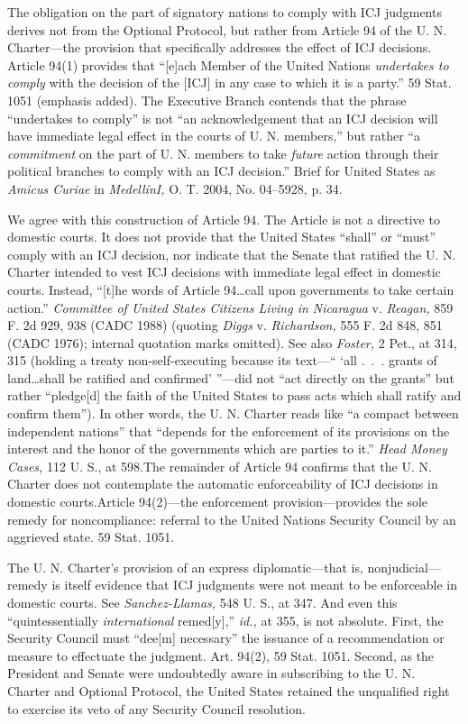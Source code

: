 {{{  The obligation on the part of signatory nations to comply with ICJ
judgments derives not from the Optional Protocol, but rather from
Article 94 of the U. N. Charter---the provision that specifically
addresses the effect of ICJ decisions. Article 94(1) provides that
``[e]ach Member of the United Nations \emph{undertakes to comply} with
the decision of the [ICJ] in any case to which it is a party.'' 59
Stat. 1051 (emphasis added). The Executive Branch contends that the
phrase ``undertakes to comply'' is not ``an acknowledgement that an
ICJ decision will have immediate legal effect in the courts of U. N.
members,'' but rather ``a \emph{commitment} on the part of U. N. members
to take \emph{future} action through their political branches to comply
with an ICJ decision.'' Brief for United States as \emph{Amicus Curiae}
in \emph{MedellínI,} O. T. 2004, No. 04--5928, p. 34.

  We agree with this construction of Article 94. The Article is not
a directive to domestic courts. It does not provide that the United
States ``shall'' or ``must'' comply with an ICJ decision, nor
indicate that the Senate that ratified the U. N. Charter intended to
vest ICJ decisions with immediate legal effect in domestic courts.
Instead, ``[t]he words of Article 94\dots call upon governments to
take certain action.'' \emph{Committee of United States Citizens Living
in Nicaragua} v. \emph{Reagan,} 859 F. 2d 929, 938 (CADC 1988) (quoting
\emph{Diggs} v. \emph{Richardson,} 555 F. 2d 848, 851 (CADC 1976); internal
quotation marks omitted). See also \emph{Foster,} 2 Pet., at 314, 315
(holding a treaty non-self-executing because its text---`` ‘all
.~.~. grants of land\dots shall be ratified and confirmed'
''---did not ``act directly on the grants'' but rather ``pledge[d]
the faith of the United States to pass acts which shall ratify and
confirm them''). In other words, the U. N. Charter reads like
``a compact between independent nations'' that ``depends for the
enforcement of its provisions on the interest and the \newpage  honor of
the governments which are parties to it.'' \emph{Head Money Cases,}
112 U. S., at 598.\footnotemark[5] The remainder of Article 94 confirms that
the U. N. Charter does not contemplate the automatic enforceability of
ICJ decisions in domestic courts.\footnotemark[6] Article 94(2)---the enforcement
provision---provides the sole remedy for noncompliance: referral to
the United Nations Security Council by an aggrieved state. 59 Stat.
1051.

  The U. N. Charter's provision of an express diplomatic---that is,
nonjudicial---remedy is itself evidence that ICJ judgments were not
meant to be enforceable in domestic courts. See \emph{Sanchez-Llamas,}
548 U. S., at 347. And even this ``quintessentially \emph{international}
remed[y],'' \emph{id.,} at 355, is not absolute. First, the Security
Council must ``dee[m] necessary'' the issuance of a recommendation
or measure to effectuate the judgment. Art. 94(2), 59 Stat. 1051.
Second, as the President and Senate were undoubtedly aware in
subscribing to the U. N. Charter and Optional Protocol, the \newpage 
United States retained the unqualified right to exercise its veto of any
Security Council resolution.

}}}

